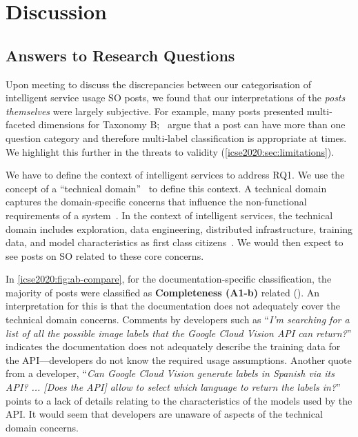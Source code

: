 \section{Discussion}
\label{icse2020:sec:discussion}



\subsection{Answers to Research Questions}


\noindent
\textbf{}
Upon meeting to discuss the discrepancies between our categorisation of intelligent service usage SO posts, we found that our interpretations of the \textit{posts themselves} were largely subjective. For example, many posts presented multi-faceted dimensions for Taxonomy B;~\citet{Beyer:2018fm} argue that a post can have more than one question category and therefore multi-label classification is appropriate at times. We highlight this further in the threats to validity (\cref{icse2020:sec:limitations}).

We have to define the context of intelligent services to address RQ1. We use the concept of a ``technical domain''~\citep{Barnett:2018Kx} to define this context. A technical domain captures the domain-specific concerns that influence the non-functional requirements of a system~\citep{Barnett:2018Kx}. In the context of intelligent services, the technical domain includes exploration, data engineering, distributed infrastructure, training data, and model characteristics as first class citizens~\citep{Barnett:2018Kx}. We would then expect to see posts on SO related to these core concerns. 

In \cref{icse2020:fig:ab-compare}, for the documentation-specific classification, the majority of posts were classified as \textbf{Completeness (A1-b)} related (\PctTaxACompleteness{}). An interpretation for this is that the documentation does not adequately cover the technical domain concerns. Comments by developers such as ``\textit{I'm searching for a list of all the possible image labels that the Google Cloud Vision API can return?}'' indicates the documentation does not adequately describe the training data for the API---developers do not know the required usage assumptions. Another quote from a developer, ``\textit{Can Google Cloud Vision generate labels in Spanish via its API? ... [Does the API] allow to select which language to return the labels in?}'' points to a lack of details relating to the characteristics of the models used by the API. It would seem that developers are unaware of aspects of the technical domain concerns.%

